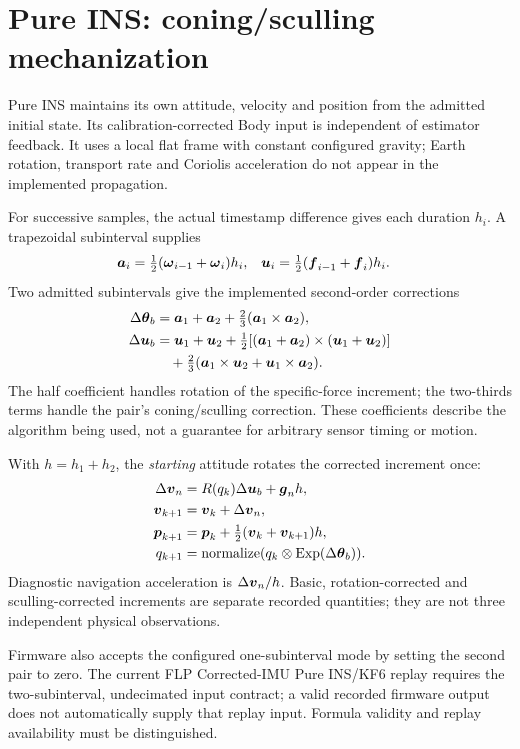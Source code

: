 \section{Pure INS: coning/sculling mechanization}
\label{sec:ins}
Pure INS maintains its own attitude, velocity and position from the admitted initial state. Its calibration-corrected Body input is independent of estimator feedback. It uses a local flat frame with constant configured gravity; Earth rotation, transport rate and Coriolis acceleration do not appear in the implemented propagation.

For successive samples, the actual timestamp difference gives each duration $h_i$. A trapezoidal subinterval supplies
\begin{align}
\boldsymbol{a}_i&=\tfrac12(\boldsymbol{\omega}_{i-1}+\boldsymbol{\omega}_i)h_i,&
\boldsymbol{u}_i&=\tfrac12(\boldsymbol{f}_{i-1}+\boldsymbol{f}_i)h_i.
\label{eq:ins-input}
\end{align}
Two admitted subintervals give the implemented second-order corrections
\begin{align}
\Delta\boldsymbol{\theta}_b&=\boldsymbol{a}_1+\boldsymbol{a}_2+\tfrac23(\boldsymbol{a}_1\times\boldsymbol{a}_2),
\label{eq:coning}\\
\Delta\boldsymbol{u}_b&=\boldsymbol{u}_1+\boldsymbol{u}_2
+\tfrac12[(\boldsymbol{a}_1+\boldsymbol{a}_2)\times(\boldsymbol{u}_1+\boldsymbol{u}_2)]\nonumber\\
&\quad+\tfrac23(\boldsymbol{a}_1\times\boldsymbol{u}_2+\boldsymbol{u}_1\times\boldsymbol{a}_2).
\label{eq:sculling}
\end{align}
The half coefficient handles rotation of the specific-force increment; the two-thirds terms handle the pair's coning/sculling correction. These coefficients describe the algorithm being used, not a guarantee for arbitrary sensor timing or motion.

With $h=h_1+h_2$, the \emph{starting} attitude rotates the corrected increment once:
\begin{align}
\Delta\boldsymbol{v}_n&=R(q_k)\Delta\boldsymbol{u}_b+\boldsymbol{g}_n h,
\label{eq:nav-dv}\\
\boldsymbol{v}_{k+1}&=\boldsymbol{v}_k+\Delta\boldsymbol{v}_n,\\
\boldsymbol{p}_{k+1}&=\boldsymbol{p}_k+\tfrac12(\boldsymbol{v}_k+\boldsymbol{v}_{k+1})h,\\
q_{k+1}&=\operatorname{normalize}(q_k\otimes\operatorname{Exp}(\Delta\boldsymbol{\theta}_b)).
\label{eq:ins-propagation}
\end{align}
Diagnostic navigation acceleration is $\Delta\boldsymbol{v}_n/h$. Basic, rotation-corrected and sculling-corrected increments are separate recorded quantities; they are not three independent physical observations.

Firmware also accepts the configured one-subinterval mode by setting the second pair to zero. The current FLP Corrected-IMU Pure INS/KF6 replay requires the two-subinterval, undecimated input contract; a valid recorded firmware output does not automatically supply that replay input. Formula validity and replay availability must be distinguished.


